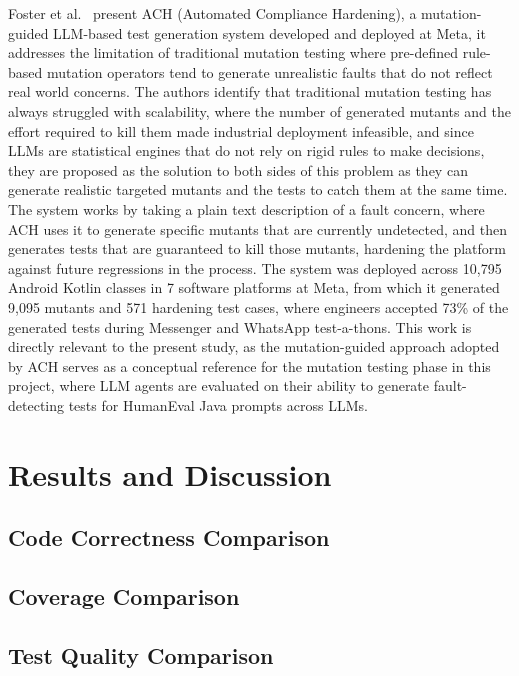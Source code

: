 \documentclass[journal]{IEEEtran}
\begin{document}
Foster et al.~\cite{ach} present ACH (Automated Compliance Hardening), a mutation-guided LLM-based test generation system developed and deployed at Meta, it addresses the limitation of traditional mutation testing where pre-defined rule-based mutation operators tend to generate unrealistic faults that do not reflect real world concerns. The authors identify that traditional mutation testing has always struggled with scalability, where the number of generated mutants and the effort required to kill them made industrial deployment infeasible, and since LLMs are statistical engines that do not rely on rigid rules to make decisions, they are proposed as the solution to both sides of this problem as they can generate realistic targeted mutants and the tests to catch them at the same time. The system works by taking a plain text description of a fault concern, where ACH uses it to generate specific mutants that are currently undetected, and then generates tests that are guaranteed to kill those mutants, hardening the platform against future regressions in the process. The system was deployed across 10,795 Android Kotlin classes in 7 software platforms at Meta, from which it generated 9,095 mutants and 571 hardening test cases, where engineers accepted 73\% of the generated tests during Messenger and WhatsApp test-a-thons. This work is directly relevant to the present study, as the mutation-guided approach adopted by ACH serves as a conceptual reference for the mutation testing phase in this project, where LLM agents are evaluated on their ability to generate fault-detecting tests for HumanEval Java prompts across LLMs.

\section{Results and Discussion}

\subsection{Code Correctness Comparison}

\subsection{Coverage Comparison}

\subsection{Test Quality Comparison}
\end{document}
